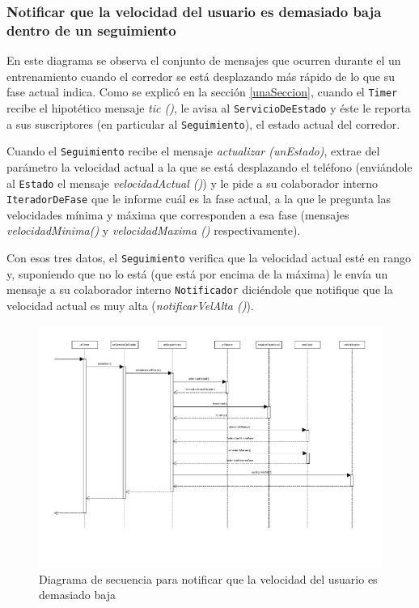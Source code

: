 \newpage

\subsubsection{Notificar que la velocidad del usuario es demasiado baja dentro de un seguimiento}

En este diagrama se observa el conjunto de mensajes que ocurren durante el un entrenamiento cuando el corredor se está desplazando más rápido de lo que su fase actual indica. Como se explicó en la sección \ref{unaSeccion}, cuando el \texttt{Timer} recibe el hipotético mensaje \emph{tic ()}, le avisa al \texttt{ServicioDeEstado} y éste le reporta a sus suscriptores (en particular al \texttt{Seguimiento}), el estado actual del corredor.

Cuando el \texttt{Seguimiento} recibe el mensaje \emph{actualizar (unEstado)}, extrae del parámetro la velocidad actual a la que se está desplazando el teléfono (enviándole al \texttt{Estado} el mensaje \emph{velocidadActual ()}) y le pide a su colaborador interno \texttt{IteradorDeFase} que le informe cuál es la fase actual, a la que le pregunta las velocidades mínima y máxima que corresponden a esa fase (mensajes \emph{velocidadMinima()} y \emph{velocidadMaxima ()} respectivamente).

Con esos tres datos, el \texttt{Seguimiento} verifica que la velocidad actual esté en rango y, suponiendo que no lo está (que está por encima de la máxima) le envía un mensaje a su colaborador interno \texttt{Notificador} diciéndole que notifique que la velocidad actual es muy alta (\emph{notificarVelAlta ()}). 

\newpage

\begin{landscape}
	\begin{figure}[h]
		\includegraphics[scale=0.8]{images/Velocidad.pdf}
		\caption{Diagrama de secuencia para notificar que la velocidad del usuario es demasiado baja}
	\end{figure} 
\end{landscape}

